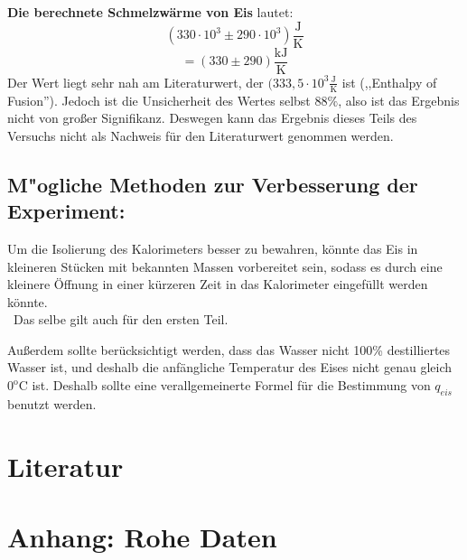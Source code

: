 \documentclass[11pt,a4paper]{article} %
\begin{document}
\textbf{Die berechnete Schmelzw\"arme von Eis} lautet:
$$(330\cdot10^{3} \pm 290\cdot10^{3}) \mathrm{\frac{J}{K}}$$
$$=(330 \pm 290) \mathrm{\frac{kJ}{K}}$$
Der Wert liegt sehr nah am  Literaturwert, der $(333,5\cdot10^{3}\mathrm{\frac{J}{K}}$ ist (,,Enthalpy of Fusion'').
Jedoch ist die Unsicherheit des Wertes selbst $88\%$, also ist das Ergebnis nicht von gro{\ss}er Signifikanz. Deswegen kann das Ergebnis dieses Teils des Versuchs nicht als Nachweis für den Literaturwert genommen werden.

\subsection{M"ogliche Methoden zur Verbesserung der Experiment: }

Um die Isolierung des Kalorimeters besser zu bewahren, könnte das Eis in kleineren Stücken mit bekannten Massen vorbereitet sein, sodass es durch eine kleinere Öffnung in einer kürzeren Zeit in das Kalorimeter eingef\"ullt werden könnte.
\\\
Das selbe gilt auch f\"ur den ersten Teil.

Außerdem sollte berücksichtigt werden, dass das Wasser nicht 100\% destilliertes Wasser ist, und deshalb die anf\"angliche Temperatur des Eises nicht genau gleich $0^{\mathrm{o}}$C ist. Deshalb sollte eine verallgemeinerte Formel f\"ur die Bestimmung von $q_{eis}$ benutzt werden.




\section{Literatur}

\section{Anhang: Rohe Daten}
\end{document}
